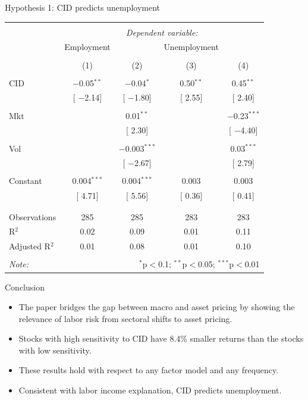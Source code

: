 \documentclass{beamer}
\begin{document}
\begin{frame}{Hypothesis 1: CID predicts unemployment}
\begin{table}[!htbp] \centering 
  \scriptsize
\begin{tabular}{@{\extracolsep{5pt}}lcccc} 
\\[-1.8ex]\hline 
\hline \\[-1.8ex] 
 & \multicolumn{4}{c}{\textit{Dependent variable:}} \\ 
\cline{2-5} 
 & Employment &  & Unemployment &  \\ 
\\[-1.8ex] & (1) & (2) & (3) & (4)\\ 
\hline \\[-1.8ex] 
 CID & $-$0.05$^{**}$ & $-$0.04$^{*}$ & 0.50$^{**}$ & 0.45$^{**}$ \\ 
  & [ $-$2.14] & [ $-$1.80] & [ 2.55] & [ 2.40] \\ 
  & & & & \\ 
 Mkt &  & 0.01$^{**}$ &  & $-$0.23$^{***}$ \\ 
  &  & [ 2.30] &  & [ $-$4.40] \\ 
  & & & & \\ 
 Vol &  & $-$0.003$^{***}$ &  & 0.03$^{***}$ \\ 
  &  & [ $-$2.67] &  & [ 2.79] \\ 
  & & & & \\ 
 Constant & 0.004$^{***}$ & 0.004$^{***}$ & 0.003 & 0.003 \\ 
  & [ 4.71] & [ 5.56] & [ 0.36] & [ 0.41] \\ 
  & & & & \\ 
\hline \\[-1.8ex] 
Observations & 285 & 285 & 283 & 283 \\ 
R$^{2}$ & 0.02 & 0.09 & 0.01 & 0.11 \\ 
Adjusted R$^{2}$ & 0.01 & 0.08 & 0.01 & 0.10 \\ 
\hline 
\hline \\[-1.8ex] 
\textit{Note:}  & \multicolumn{4}{r}{$^{*}$p$<$0.1; $^{**}$p$<$0.05; $^{***}$p$<$0.01} \\ 
\end{tabular} 
\end{table}
\end{frame}


\begin{frame}{Conclusion}
\begin{itemize}
    \item {The paper bridges the gap between macro and asset pricing by showing the relevance of labor risk from sectoral shifts to asset pricing.}
    \item {Stocks with high sensitivity to CID have 8.4\% smaller returns than the stocks with low sensitivity.}
    \item {These results hold with respect to any factor model and any frequency.}
    \item {Consistent with labor income explanation, CID predicts unemployment.}
\end{itemize}
\end{frame}
\end{document}

